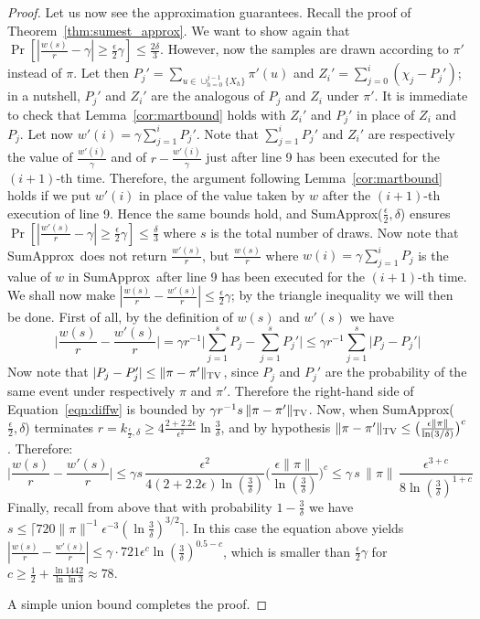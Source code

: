 \documentclass[a4paper,11pt]{article}
\newcommand{\tvd}[2]{\| {#1 - #2} \|_\textsc{TV}}
\newcommand{\sumest}{SumApprox}
\begin{document}
\begin{proof}
Let us now see the approximation guarantees.
Recall the proof of Theorem~\ref{thm:sumest_approx}.
We want to show again that $\Pr[|\frac{w(s)}{r} - \gamma| \ge \frac{\epsilon}{2}\gamma] \le \frac{2\delta}{3}$.
However, now the samples are drawn according to $\pi'$ instead of $\pi$.
Let then $P_j'=\sum_{u\in \cup_{h=0}^{j-1} \{X_h\}}\! \pi'(u)$ and $Z_i'=\sum_{j=0}^i (\chi_j - P_{j}')$; in a nutshell, $P_j'$ and $Z_i'$ are the analogous of $P_j$ and $Z_i$ under $\pi'$.
It is immediate to check that Lemma~\ref{cor:martbound} holds with $Z_i'$ and $P_j'$ in place of $Z_i$ and $P_j$.
Let now $w'(i) = \gamma \sum_{j=1}^i P_{j}'$.
Note that $\sum_{j=1}^i P_{j}'$ and $Z_i'$ are respectively the value of $\frac{w'(i)}{\gamma}$ and of $r - \frac{w'(i)}{\gamma}$ just after line 9 has been executed for the $(i+1)$-th time.
Therefore, the argument following Lemma~\ref{cor:martbound} holds if we put $w'(i)$ in place of the value taken by $w$ after the $(i+1)$-th execution of line 9.
Hence the same bounds hold, and \sumest($\frac{\epsilon}{2},\delta$) ensures $\Pr[|\frac{w'(s)}{r} - \gamma| \ge \frac{\epsilon}{2}\gamma] \le \frac{\delta}{3}$ where $s$ is the total number of draws.
Now note that \sumest\ does not return $\frac{w'(s)}{r}$, but $\frac{w(s)}{r}$ where $w(i) = \gamma \sum_{j=1}^i P_{j}$ is the value of $w$ in \sumest\ after line 9 has been executed for the $(i+1)$-th time.
We shall now make $|\frac{w(s)}{r} - \frac{w'(s)}{r}| \le \frac{\epsilon}{2}\gamma$; by the triangle inequality we will then be done.
First of all, by the definition of $w(s)$ and $w'(s)$ we have
\begin{equation}
\label{eqn:diffw}
\Big|\frac{w(s)}{r} - \frac{w'(s)}{r}\Big| = \gamma r^{-1} \Big|\sum_{j=1}^s P_{j} - \sum_{j=1}^s P_j'\Big| \le \gamma r^{-1} \sum_{j=1}^s \big|P_{j} - P_j'\big|
\end{equation}
Now note that $|P_j - P_j'| \le \tvd{\pi}{\pi'}$, since $P_j$ and $P_j'$ are the probability of the same event under respectively $\pi$ and $\pi'$.
Therefore the right-hand side of Equation~\ref{eqn:diffw} is bounded by $\gamma r^{-1} s \, \tvd{\pi}{\pi'}$.
Now, when \sumest($\frac{\epsilon}{2},\delta$) terminates $r = k_{\frac{\epsilon}{2},\delta} \ge 4\frac{2 + 2.2\epsilon}{\epsilon^2}\ln\frac{3}{\delta}$, and by hypothesis $\tvd{\pi}{\pi'} \le \big(\frac{\epsilon \|\pi\|}{\ln(3/\delta)}\big)^c$.
Therefore:
\begin{equation}
\Big|\frac{w(s)}{r} - \frac{w'(s)}{r}\Big|
\le \gamma s \, \frac{\epsilon^2}{4(2 + 2.2\epsilon)\ln(\frac{3}{\delta})} \Big(\frac{\epsilon \|\pi\|}{\ln(\frac{3}{\delta})}\Big)^c
\le \gamma \, s \, \|\pi\| \, \frac{\epsilon^{3+c}}{8\ln(\frac{3}{\delta})^{1+c}} 
\end{equation}
Finally, recall from above that with probability $1-\frac{3}{\delta}$ we have $s \le \lceil 720 \|\pi\|^{-1} \epsilon^{-3}(\ln{\frac{3}{\delta}})^{3/2} \rceil$.
In this case the equation above yields $|\frac{w(s)}{r} - \frac{w'(s)}{r}| \le \gamma \cdot 721 \epsilon^c \ln(\frac{3}{\delta})^{0.5-c} $, which is smaller than $\frac{\epsilon}{2}\gamma$ for $c \ge \frac{1}{2}+ \frac{\ln 1442}{\ln \ln 3} \approx 78$.

A simple union bound completes the proof.
\end{proof}
\end{document}
